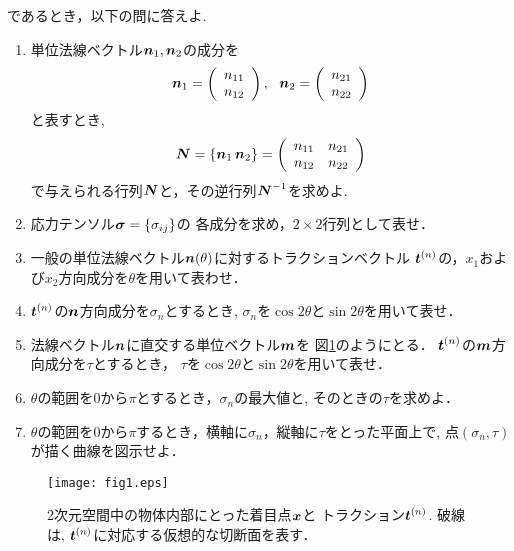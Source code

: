 \documentclass[10pt,a4j]{jarticle}
\begin{document}
であるとき，以下の問に答えよ.
\begin{enumerate}
\item
	単位法線ベクトル$\mbox{\boldmath $n$}_1, \mbox{\boldmath $n$}_2$の成分を
	\[
	\fat{n}_1=
	\left(
		\begin{array}{c}
			n_{11} \\
			n_{12}
		\end{array}
	\right), \ \ 
	\fat{n}_2=
	\left(
		\begin{array}{c}
			n_{21}\\
			n_{22}
		\end{array}
	\right)
	\]
	と表すとき,
	\[
		\mbox{\boldmath $N$}=\left\{ \mbox{\boldmath $n$}_1 \, \mbox{\boldmath $n$}_2 \right\} =
		\left(
		\begin{array}{cc}
			n_{11} & n_{21}  \\
			n_{12} & n_{22} 
		\end{array}
		\right)
	\]
	で与えられる行列$\mbox{\boldmath $N$}$と，その逆行列$\mbox{\boldmath $N$}^{-1}$を求めよ.
\item
	応力テンソル$\mbox{\boldmath $\sigma$}=\left\{\sigma_{ij}\right\}$の
	各成分を求め，$2\times 2$行列として表せ．
\item
	一般の単位法線ベクトル$\mbox{\boldmath $n$}(\theta)$に対するトラクションベクトル
	$\mbox{\boldmath $t$}^{(n)}$の，$x_1$および$x_2$方向成分を$\theta$を用いて表わせ．
\item
	$\mbox{\boldmath $t$}^{(n)}$の$\mbox{\boldmath $n$}$方向成分を$\sigma_n$とするとき,
	$\sigma_n$を$\cos 2\theta$と$\sin 2\theta$を用いて表せ．
\item
	法線ベクトル$\mbox{\boldmath $n$}$に直交する単位ベクトル$\mbox{\boldmath $m$}$を
	図\ref{fig:fig1}のようにとる．
	$\mbox{\boldmath $t$}^{(n)}$の$\mbox{\boldmath $m$}$方向成分を$\tau$とするとき，
	$\tau$を$\cos 2\theta$と$\sin 2\theta$を用いて表せ．
\item
	$\theta$の範囲を$0$から$\pi$とするとき，$\sigma_n$の最大値と, 
	そのときの$\tau$を求めよ．
\item
	$\theta$の範囲を$0$から$\pi$するとき，横軸に$\sigma_n$，縦軸に$\tau$をとった平面上で, 点$(\sigma_n, \tau)$が描く曲線を図示せよ．
\end{enumerate}
\begin{figure}[h]
	\begin{center}
	\texttt{[image: fig1.eps]} 
	\end{center}
	\caption{
		2次元空間中の物体内部にとった着目点$\mbox{\boldmath $x$}$と
		トラクション$\mbox{\boldmath $t$}^{(n)}$.
		破線は, $\mbox{\boldmath $t$}^{(n)}$に対応する仮想的な切断面を表す．	
	} 
	\label{fig:fig1}
\end{figure}
\end{document}
